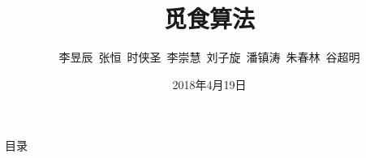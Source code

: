 \documentclass{beamer}
\begin{document}
\small

\begin{frame}
	\title{觅食算法}
	\author{李昱辰\ 张恒\ 时侠圣\ 李崇慧\ 刘子旋\ 潘镇涛\ 朱春林\ 谷超明}
	\date{2018年4月19日}
	\titlepage
\end{frame}

\begin{frame}{目录}
\tableofcontents
\end{frame}








\end{document}
